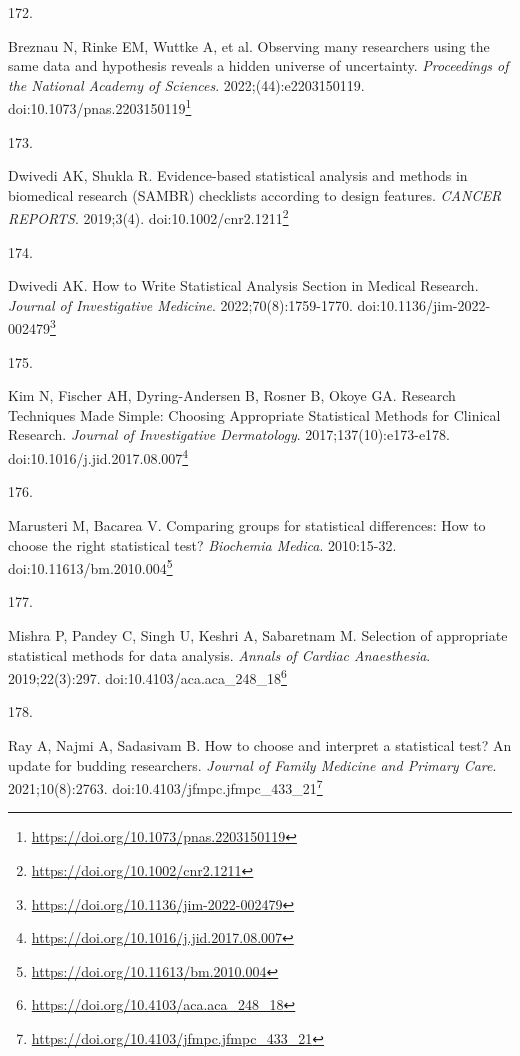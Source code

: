 \documentclass[
  a4paper,
]{book}
\newlength{\cslhangindent}
\newlength{\csllabelwidth}
\newlength{\cslentryspacingunit} %
\newenvironment{CSLReferences}[2] %
 {%
  \setlength{\parindent}{0pt}
  \ifodd #1
  \let\oldpar\par
  \def\par{\hangindent=\cslhangindent\oldpar}
  \fi
  \setlength{\parskip}{#2\cslentryspacingunit}
 }%
 {}
\newcommand{\CSLLeftMargin}[1]{\parbox[t]{\csllabelwidth}{#1}}
\newcommand{\CSLRightInline}[1]{\parbox[t]{\linewidth - \csllabelwidth}{#1}\break}
\renewcommand{\href}[2]{#2\footnote{\url{#1}}}
\begin{document}
\begin{CSLReferences}{0}{0}
\leavevmode{}%
\CSLLeftMargin{172. }%
\CSLRightInline{Breznau N, Rinke EM, Wuttke A, et al. Observing many researchers using the same data and hypothesis reveals a hidden universe of uncertainty. \emph{Proceedings of the National Academy of Sciences}. 2022;(44):e2203150119. doi:\href{https://doi.org/10.1073/pnas.2203150119}{10.1073/pnas.2203150119}}

\leavevmode{}%
\CSLLeftMargin{173. }%
\CSLRightInline{Dwivedi AK, Shukla R. Evidence{-}based statistical analysis and methods in biomedical research (SAMBR) checklists according to design features. \emph{CANCER REPORTS}. 2019;3(4). doi:\href{https://doi.org/10.1002/cnr2.1211}{10.1002/cnr2.1211}}

\leavevmode{}%
\CSLLeftMargin{174. }%
\CSLRightInline{Dwivedi AK. How to Write Statistical Analysis Section in Medical Research. \emph{Journal of Investigative Medicine}. 2022;70(8):1759-1770. doi:\href{https://doi.org/10.1136/jim-2022-002479}{10.1136/jim-2022-002479}}

\leavevmode{}%
\CSLLeftMargin{175. }%
\CSLRightInline{Kim N, Fischer AH, Dyring-Andersen B, Rosner B, Okoye GA. Research Techniques Made Simple: Choosing Appropriate Statistical Methods for Clinical Research. \emph{Journal of Investigative Dermatology}. 2017;137(10):e173-e178. doi:\href{https://doi.org/10.1016/j.jid.2017.08.007}{10.1016/j.jid.2017.08.007}}

\leavevmode{}%
\CSLLeftMargin{176. }%
\CSLRightInline{Marusteri M, Bacarea V. Comparing groups for statistical differences: How to choose the right statistical test? \emph{Biochemia Medica}. 2010:15-32. doi:\href{https://doi.org/10.11613/bm.2010.004}{10.11613/bm.2010.004}}

\leavevmode{}%
\CSLLeftMargin{177. }%
\CSLRightInline{Mishra P, Pandey C, Singh U, Keshri A, Sabaretnam M. Selection of appropriate statistical methods for data analysis. \emph{Annals of Cardiac Anaesthesia}. 2019;22(3):297. doi:\href{https://doi.org/10.4103/aca.aca_248_18}{10.4103/aca.aca\_248\_18}}

\leavevmode{}%
\CSLLeftMargin{178. }%
\CSLRightInline{Ray A, Najmi A, Sadasivam B. How to choose and interpret a statistical test? An update for budding researchers. \emph{Journal of Family Medicine and Primary Care}. 2021;10(8):2763. doi:\href{https://doi.org/10.4103/jfmpc.jfmpc_433_21}{10.4103/jfmpc.jfmpc\_433\_21}}


\end{CSLReferences}
\end{document}
